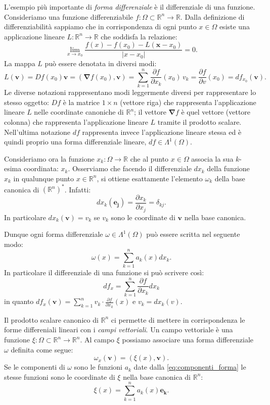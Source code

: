 \documentclass[italian,a4paper]{scrartcl}
\newcommand{\RR}{{\mathbb R}}
\renewcommand{\vec}{\mathbf}
\newcommand{\vecnabla}{\mathbf{\nabla}}
\begin{document}
L'esempio più importante di \emph{forma differenziale} è il
differenziale di una funzione.
Consideriamo una funzione differenziabile $f\colon \Omega\subset
\RR^n\to \RR$. Dalla definizione di differenziabilità sappiamo che in
corrispondenza di ogni punto $x\in \Omega$ esiste una applicazione
lineare $L\colon \RR^n \to \RR$ che soddisfa la relazione:
\[
\lim_{x\to x_0} \frac{f(x) - f(x_0) - L(\vec
  x-x_0)}{\lvert x-x_0\rvert} = 0.
\]
La mappa $L$ può essere denotata in diversi modi:
\[
L (\vec v)
= Df(x_0) \vec v
= (\vecnabla f(x_0),\vec v)
= \sum_{k=1}^n \frac{\partial f}{\partial x_k}(x_0) \, v_k
= \frac{\partial f}{\partial v}(x_0)
= df_{x_0}(\vec v).
\]
Le diverse notazioni rappresentano modi leggermente diversi per
rappresentare lo stesso oggetto: $Df$ è la matrice $1\times n$
(vettore riga) che
rappresenta l'applicazione lineare $L$ nelle coordinate canoniche di
$\RR^n$; il vettore $\vecnabla f$ è quel vettore (vettore colonna)
che rappresenta
l'applicazione lineare $L$ tramite il prodotto scalare. Nell'ultima
notazione $df$ rappresenta invece l'applicazione lineare stessa ed è
quindi proprio una forma differenziale lineare, $df\in \Lambda^1(\Omega)$.

Consideriamo ora la funzione $x_k\colon \Omega\to \RR$ che al punto
$x\in \Omega$ associa la sua $k$-esima coordinata: $x_k$.
Osserviamo che facendo il differenziale $dx_k$ della funzione $x_k$ in
qualunque punto $x \in \RR^n$,
si ottiene esattamente l'elemento $\omega_k$ della base canonica di
$(\RR^n)^*$. Infatti:
\[
dx_k(\vec{e_j}) = \frac{\partial x_k}{\partial x_j} = \delta_{kj}.
\]
In particolare $dx_k(\vec{v}) = v_k$ se $v_k$ sono le coordinate di
$\vec{v}$ nella base canonica.

Dunque ogni forma differenziale $\omega \in \Lambda^1(\Omega)$ può
essere scritta nel seguente modo:
\begin{equation}\label{eq:componenti_forma}
   \omega(x) = \sum_{k=1}^n a_k(x) dx_k.
\end{equation}
In particolare il differenziale di una funzione si può scrivere così:
\[
  df_{x} = \sum_{k=1}^n \frac{\partial f}{\partial x_k} dx_k
\]
in quanto 
$df_{x}(\vec v) 
= \sum_{k=1}^n v_k \cdot \frac{\partial f}{\partial
  x_k}(x)$
e $v_k = dx_k(v)$.

Il prodotto scalare canonico di $\RR^n$ ci permette di mettere in
corrispondenza le forme differeniali lineari con i \emph{campi
  vettoriali}.
Un campo vettoriale è una funzione $\xi \colon \Omega\subset \RR^n \to
\RR^n$. Al campo $\xi$ possiamo associare una forma differenziale
$\omega$ definita come segue:
\[
  \omega_{x}(\vec v) = (\xi(x),\vec v).
\]
Se le componenti di $\omega$ sono le funzioni $a_k$ date dalla
\eqref{eq:componenti_forma} le stesse funzioni sono le coordinate di
$\xi$ nella base canonica di $\RR^n$:
\[
  \xi(x) = \sum_{k=1}^n a_k(x) \vec{e_k}.
\]
\end{document}

